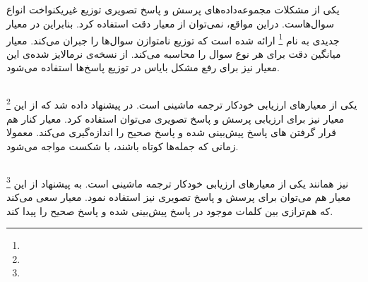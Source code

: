 \subsection[\lr{MPT}]{\cite{kafle2017analysis}}

		یکی از مشکلات مجموعه‌داده‌های پرسش و پاسخ تصویری توزیع غیریکنواخت انواع سوال‌هاست. دراین مواقع، نمی‌توان از معیار دقت استفاده کرد. بنابراین  در 
	\cite{kafle2017analysis}
		 معیار جدیدی به نام 
	\footnote{}
		ارائه شده است که توزیع نامتوازن سوال‌ها را جبران می‌کند. معیار 
	میانگین دقت برای هر نوع سوال را محاسبه می‌کند. از نسخه‌ی نرمالایز شده‌ی این معیار نیز برای رفع مشکل بایاس در توزیع پاسخ‌ها استفاده می‌شود.


\subsection[\lr{BLEU}]{\cite{papineni2002bleu}}

		\footnote{}
		یکی از معیارهای ارزیابی خودکار ترجمه ماشینی است. در
		\cite{gurari2018vizwiz}
		 پیشنهاد داده شد که از این معیار نیز برای ارزیابی پرسش و پاسخ تصویری می‌توان استفاده کرد. معیار 
		کنار هم قرار گرفتن 
		های پاسخ پیش‌‌بینی شده و پاسخ صحیح را اندازه‌گیری می‌کند. معمولا
	زمانی که جمله‌ها کوتاه باشند، با شکست مواجه می‌‌شود.
		


\subsection[\lr{METEOR}]{\cite{denkowski2014meteor}}
		\footnote{}
		نیز همانند
	یکی از معیارهای ارزیابی خودکار ترجمه ماشینی است. به پیشنهاد 
	\cite{gurari2018vizwiz}
	 از این معیار هم می‌توان برای پرسش و پاسخ تصویری نیز استفاده نمود. معیار 
		سعی می‌کند که هم‌ترازی بین کلمات موجود در پاسخ پیش‌بینی شده و پاسخ صحیح را پیدا کند.
